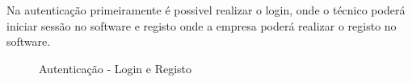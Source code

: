 Na autenticação primeiramente é possivel realizar o login, onde o técnico poderá iniciar sessão no software 
e registo onde a empresa poderá realizar o registo no software.

\begin{figure}[htb]%
    \centering
    \qquad
    \caption{Autenticação - Login e Registo}%
    \label{fig:24}
\end{figure}


